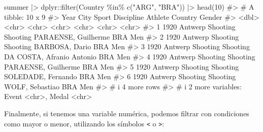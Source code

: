 \documentclass[
  letterpaper,
  DIV=11,
  numbers=noendperiod,
  oneside]{scrreprt}
\newenvironment{Shaded}{\begin{snugshade}}{\end{snugshade}}
\newcommand{\CommentTok}[1]{\textcolor[rgb]{0.37,0.37,0.37}{#1}}
\newcommand{\DecValTok}[1]{\textcolor[rgb]{0.68,0.00,0.00}{#1}}
\newcommand{\FunctionTok}[1]{\textcolor[rgb]{0.28,0.35,0.67}{#1}}
\newcommand{\NormalTok}[1]{\textcolor[rgb]{0.00,0.23,0.31}{#1}}
\newcommand{\SpecialCharTok}[1]{\textcolor[rgb]{0.37,0.37,0.37}{#1}}
\newcommand{\StringTok}[1]{\textcolor[rgb]{0.13,0.47,0.30}{#1}}
\begin{document}
\begin{Shaded}
\begin{Highlighting}[]
\NormalTok{summer }\SpecialCharTok{|\textgreater{}}\NormalTok{ dplyr}\SpecialCharTok{::}\FunctionTok{filter}\NormalTok{(Country }\SpecialCharTok{\%in\%} \FunctionTok{c}\NormalTok{(}\StringTok{"ARG"}\NormalTok{, }\StringTok{"BRA"}\NormalTok{)) }\SpecialCharTok{|\textgreater{}} \FunctionTok{head}\NormalTok{(}\DecValTok{10}\NormalTok{)}
\CommentTok{\#\textgreater{} \# A tibble: 10 x 9}
\CommentTok{\#\textgreater{}    Year City    Sport    Discipline Athlete                   Country Gender}
\CommentTok{\#\textgreater{}   \textless{}dbl\textgreater{} \textless{}chr\textgreater{}   \textless{}chr\textgreater{}    \textless{}chr\textgreater{}      \textless{}chr\textgreater{}                     \textless{}chr\textgreater{}   \textless{}chr\textgreater{} }
\CommentTok{\#\textgreater{} 1  1920 Antwerp Shooting Shooting   PARAENSE, Guilherme       BRA     Men   }
\CommentTok{\#\textgreater{} 2  1920 Antwerp Shooting Shooting   BARBOSA, Dario            BRA     Men   }
\CommentTok{\#\textgreater{} 3  1920 Antwerp Shooting Shooting   DA COSTA, Afranio Antonio BRA     Men   }
\CommentTok{\#\textgreater{} 4  1920 Antwerp Shooting Shooting   PARAENSE, Guilherme       BRA     Men   }
\CommentTok{\#\textgreater{} 5  1920 Antwerp Shooting Shooting   SOLEDADE, Fernando        BRA     Men   }
\CommentTok{\#\textgreater{} 6  1920 Antwerp Shooting Shooting   WOLF, Sebastiao           BRA     Men   }
\CommentTok{\#\textgreater{} \# i 4 more rows}
\CommentTok{\#\textgreater{} \# i 2 more variables: Event \textless{}chr\textgreater{}, Medal \textless{}chr\textgreater{}}
\end{Highlighting}
\end{Shaded}

Finalmente, si tenemos una variable numérica, podemos filtrar con
condiciones como mayor o menor, utilizando los símbolos
\texttt{\textless{}} o \texttt{\textgreater{}}:
\end{document}
